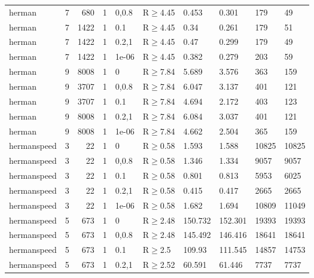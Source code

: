 \begin{longtable}{llrrllllll}
 herman        & 7        &    	680 & 1 & 0,0.8 & R$\geq$4.45  & 0.453   & 0.301    & 179    & 49     \\
 herman        & 7        &   	1422 & 1 & 0.1   & R$\geq$4.45  & 0.34    & 0.261    & 179    & 51     \\
 herman        & 7        &   	1422 & 1 & 0.2,1 & R$\geq$4.45  & 0.47    & 0.299    & 179    & 49     \\
 herman        & 7        &   	1422 & 1 & 1e-06 & R$\geq$4.45  & 0.382   & 0.279    & 203    & 59     \\
 herman        & 9        &   	8008 & 1 & 0     & R$\geq$7.84  & 5.689   & 3.576    & 363    & 159    \\
 herman        & 9        &   	3707 & 1 & 0,0.8 & R$\geq$7.84  & 6.047   & 3.137    & 401    & 121    \\
 herman        & 9        &   	3707 & 1 & 0.1   & R$\geq$7.84  & 4.694   & 2.172    & 403    & 123    \\
 herman        & 9        &   	8008 & 1 & 0.2,1 & R$\geq$7.84  & 6.084   & 3.037    & 401    & 121    \\
 herman        & 9        &   	8008 & 1 & 1e-06 & R$\geq$7.84  & 4.662   & 2.504    & 365    & 159    \\
 hermanspeed   & 3        &     	22 & 1 & 0     & R$\geq$0.58  & 1.593   & 1.588    & 10825  & 10825  \\
 hermanspeed   & 3        &     	22 & 1 & 0,0.8 & R$\geq$0.58  & 1.346   & 1.334    & 9057   & 9057   \\
 hermanspeed   & 3        &     	22 & 1 & 0.1   & R$\geq$0.58  & 0.801   & 0.813    & 5953   & 6025   \\
 hermanspeed   & 3        &     	22 & 1 & 0.2,1 & R$\geq$0.58  & 0.415   & 0.417    & 2665   & 2665   \\
 hermanspeed   & 3        &     	22 & 1 & 1e-06 & R$\geq$0.58  & 1.682   & 1.694    & 10809  & 11049  \\
 hermanspeed   & 5        &    	673 & 1 & 0     & R$\geq$2.48  & 150.732 & 152.301  & 19393  & 19393  \\
 hermanspeed   & 5        &    	673 & 1 & 0,0.8 & R$\geq$2.48  & 145.492 & 146.416  & 18641  & 18641  \\
 hermanspeed   & 5        &    	673 & 1 & 0.1   & R$\geq$2.5   & 109.93  & 111.545  & 14857  & 14753  \\
 hermanspeed   & 5        &    	673 & 1 & 0.2,1 & R$\geq$2.52  & 60.591  & 61.446   & 7737   & 7737   \\

\end{longtable}
